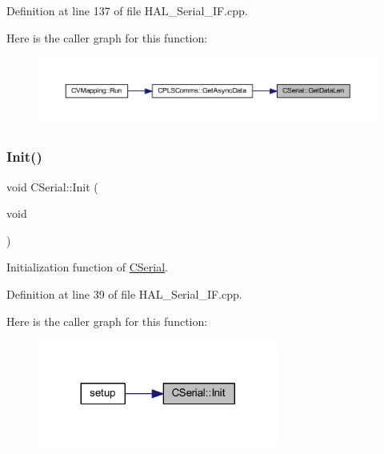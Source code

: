 Definition at line 137 of file H\+A\+L\+\_\+\+Serial\+\_\+\+I\+F.\+cpp.

Here is the caller graph for this function\+:\nopagebreak
\begin{figure}[H]
\begin{center}
\leavevmode
\includegraphics[width=350pt]{class_c_serial_a4327d6041fe9a390612b214709027cbb_icgraph}
\end{center}
\end{figure}
\mbox{\label{class_c_serial_aed500bd204c4b37665d6d228333edafb}} 
\subsubsection{\texorpdfstring{Init()}{Init()}}
{\footnotesize\ttfamily void C\+Serial\+::\+Init (\begin{DoxyParamCaption}\item[{void}]{ }\end{DoxyParamCaption})}



Initialization function of \mbox{\hyperlink{class_c_serial}{C\+Serial}}. 



Definition at line 39 of file H\+A\+L\+\_\+\+Serial\+\_\+\+I\+F.\+cpp.

Here is the caller graph for this function\+:\nopagebreak
\begin{figure}[H]
\begin{center}
\leavevmode
\includegraphics[width=224pt]{class_c_serial_aed500bd204c4b37665d6d228333edafb_icgraph}
\end{center}
\end{figure}
\mbox{\label{class_c_serial_a941e5cae2ca04518925a3b32f51110a6}} 

